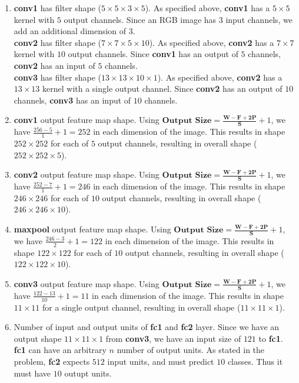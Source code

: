 \begin{tcolorbox}[title=Solution]
	\begin{enumerate}
		\item \textbf{conv1} has filter shape ($5 \times 5 \times 3 \times 5$). As specified above, \textbf{conv1} has a $5 \times 5$ kernel with $5$ output channels. Since an RGB image has 3 input channels, we add an additional dimension of $3$. \\
		      \textbf{conv2} has filter shape ($7 \times 7 \times 5 \times 10$). As specified above, \textbf{conv2} has a $7 \times 7$ kernel with $10$ output channels. Since \textbf{conv1} has an output of $5$ channels, \textbf{conv2} has an input of $5$ channels.\\
		      \textbf{conv3} has filter shape ($13 \times 13 \times 10 \times 1$). As specified above, \textbf{conv2} has a $13 \times 13$ kernel with a single output channel. Since \textbf{conv2} has an output of $10$ channels, \textbf{conv3} has an input of $10$ channels.
		\item \textbf{conv1} output feature map shape. Using $\textbf{Output Size} = \frac{\mathbf{W} - \mathbf{F} + \mathbf{2P}}{\mathbf{S}} + 1$, we have $\frac{256 - 5}{1} + 1 = 252$ in each dimension of the image. This results in shape $252 \times 252$ for each of $5$ output channels, resulting in overall shape ($252 \times 252 \times 5$).
		\item \textbf{conv2} output feature map shape. Using $\textbf{Output Size} = \frac{\mathbf{W} - \mathbf{F} + \mathbf{2P}}{\mathbf{S}} + 1$, we have $\frac{252 - 7}{1} + 1 = 246$ in each dimension of the image. This results in shape $246 \times 246$ for each of $10$ output channels, resulting in overall shape ($246 \times 246 \times 10$).
		\item \textbf{maxpool} output feature map shape. Using $\textbf{Output Size} = \frac{\mathbf{W} - \mathbf{F} + \mathbf{2P}}{\mathbf{S}} + 1$, we have $\frac{246 - 3}{2} + 1 = 122$ in each dimension of the image. This results in shape $122 \times 122$ for each of $10$ output channels, resulting in overall shape ($122 \times 122 \times 10$).
		\item \textbf{conv3} output feature map shape. Using $\textbf{Output Size} = \frac{\mathbf{W} - \mathbf{F} + \mathbf{2P}}{\mathbf{S}} + 1$, we have $\frac{122 - 13}{10} + 1 = 11$ in each dimension of the image. This results in shape $11 \times 11$ for a single output channel, resulting in overall shape ($11 \times 11 \times 1$).
		\item Number of input and output units of \textbf{fc1} and \textbf{fc2} layer. Since we have an output shape $11 \times 11 \times 1$ from \textbf{conv3}, we have an input size of $121$ to \textbf{fc1}. \textbf{fc1} can have an arbitrary $n$ number of output units. As stated in the problem, \textbf{fc2} expects $512$ input units, and must predict $10$ classes. Thus it must have $10$ outupt units.
	\end{enumerate}
\end{tcolorbox}
